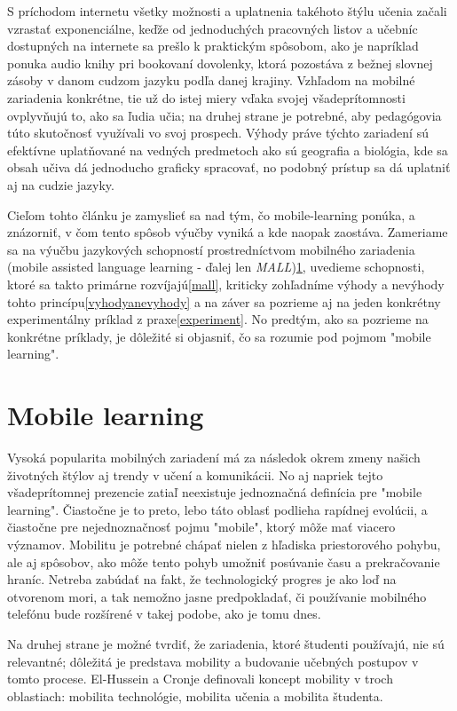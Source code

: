 \documentclass[10pt,oneside,slovak,a4paper]{article}
\begin{document}
S príchodom internetu všetky možnosti a uplatnenia takéhoto štýlu učenia začali vzrastať exponenciálne, keďže od jednoduchých pracovných listov a učebníc dostupných na internete sa prešlo k praktickým spôsobom, ako je napríklad ponuka audio knihy pri bookovaní dovolenky, ktorá pozostáva z bežnej slovnej zásoby v danom cudzom jazyku podľa danej krajiny. Vzhľadom na mobilné zariadenia konkrétne, tie už do istej miery vďaka svojej všadeprítomnosti ovplyvňujú to, ako sa ľudia učia; na druhej strane je potrebné, aby pedagógovia túto skutočnosť využívali vo svoj prospech\cite{KukulskaHulme2009}. Výhody práve týchto zariadení sú efektívne uplatňované na vedných predmetoch ako sú geografia a biológia, kde sa obsah učiva dá jednoducho graficky spracovať, no podobný prístup sa dá uplatniť aj na cudzie jazyky.

Cieľom tohto článku je zamyslieť sa nad tým, čo mobile-learning ponúka, a znázorniť, v čom tento spôsob výučby vyniká a kde naopak zaostáva. Zameriame sa na výučbu jazykových schopností prostredníctvom mobilného zariadenia (mobile assisted language learning - ďalej len \emph{MALL})\ref{ml}, uvedieme schopnosti, ktoré sa takto primárne rozvíjajú\ref{mall}, kriticky zohľadníme výhody a nevýhody tohto princípu\ref{vyhodyanevyhody} a na záver sa pozrieme aj na jeden konkrétny experimentálny príklad z praxe\ref{experiment}. No predtým, ako sa pozrieme na konkrétne príklady, je dôležité si objasniť, čo sa rozumie pod pojmom "mobile learning".


\section{Mobile learning} \label{ml}

Vysoká popularita mobilných zariadení má za následok okrem zmeny našich životných štýlov aj trendy v učení a komunikácii. No aj napriek tejto všadeprítomnej prezencie zatiaľ neexistuje jednoznačná definícia pre "mobile learning"\cite{Kim2012}. Čiastočne je to preto, lebo táto oblasť podlieha rapídnej evolúcii, a čiastočne pre nejednoznačnosť pojmu "mobile", ktorý môže mať viacero významov. Mobilitu je potrebné chápať nielen z hľadiska priestorového pohybu, ale aj spôsobov, ako môže tento pohyb umožniť posúvanie času a prekračovanie hraníc\cite{KukulskaHulme2009}. Netreba zabúdať na fakt, že technologický progres je ako loď na otvorenom mori, a tak nemožno jasne predpokladať, či používanie mobilného telefónu bude rozšírené v takej podobe, ako je tomu dnes. 

Na druhej strane je možné tvrdiť, že zariadenia, ktoré študenti používajú, nie sú relevantné; dôležitá je predstava mobility a budovanie učebných postupov v tomto procese\cite{KukulskaHulme2009}. El-Hussein a Cronje\cite{Hussein} definovali koncept mobility v troch oblastiach: mobilita technológie, mobilita učenia a mobilita študenta\cite{Kim2012}. 
\end{document}

